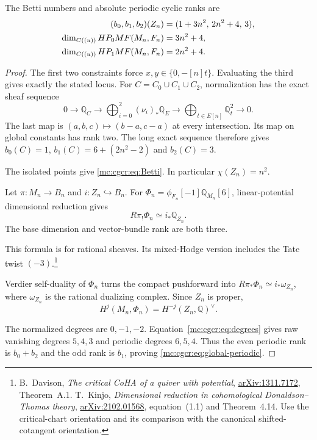 \begin{theorem}\label{mc:cgcr:thm:global-periodic}
The Betti numbers and absolute periodic cyclic ranks are
\begin{align}
 (b_0,b_1,b_2)(Z_n)&=(1+3n^2,\,2n^2+4,\,3),
       \label{mc:cgcr:eq:Betti}\\
 \dim_{\mathbb C((u))}\operatorname{HP}_{\bar0}
             \operatorname{MF}(M_n,F_n)&=3n^2+4,\notag\\
 \dim_{\mathbb C((u))}\operatorname{HP}_{\bar1}
             \operatorname{MF}(M_n,F_n)&=2n^2+4.
       \label{mc:cgcr:eq:global-periodic}
\end{align}
\end{theorem}

\begin{proof}
The first two constraints force $x,y\in\{0,-[n]t\}$.
Evaluating the third gives exactly the stated locus.
For $C=C_0\cup C_1\cup C_2$, normalization has the
exact sheaf sequence
\begin{equation}\label{mc:cgcr:eq:normalization}
 0\longrightarrow\mathbb Q_C
 \longrightarrow\bigoplus_{i=0}^2(\nu_i)_*\mathbb Q_E
 \longrightarrow\bigoplus_{t\in E[n]}\mathbb Q_t^2
 \longrightarrow0.
\end{equation}
The last map is $(a,b,c)\mapsto(b-a,c-a)$ at every
intersection. Its map on global constants has rank two.
The long exact sequence therefore gives
$b_0(C)=1$, $b_1(C)=6+(2n^2-2)$ and $b_2(C)=3$.

The isolated points give \eqref{mc:cgcr:eq:Betti}.
In particular $\chi(Z_n)=n^2$.

Let $\pi:M_n\to B_n$ and $i:Z_n\hookrightarrow B_n$.
For $\Phi_n=\phi_{F_n}[-1]\mathbb Q_{M_n}[6]$,
linear-potential dimensional reduction gives
\begin{equation}\label{mc:cgcr:eq:reduction}
 R\pi_!\Phi_n\simeq i_*\mathbb Q_{Z_n}.
\end{equation}
The base dimension and vector-bundle rank are both three.

This formula is for rational sheaves. Its mixed-Hodge
version includes the Tate twist $(-3)$.\footnote{
B.~Davison, \emph{The critical CoHA of a quiver with
potential}, \href{https://arxiv.org/abs/1311.7172}{arXiv:1311.7172},
Theorem~A.1. T.~Kinjo, \emph{Dimensional reduction in
cohomological Donaldson--Thomas theory},
\href{https://arxiv.org/abs/2102.01568}{arXiv:2102.01568},
equation~(1.1) and Theorem~4.14.
Use the critical-chart orientation and its comparison
with the canonical shifted-cotangent orientation.}

Verdier self-duality of $\Phi_n$ turns the compact
pushforward into
$R\pi_*\Phi_n\simeq i_*\omega_{Z_n}$,
where $\omega_{Z_n}$ is the rational dualizing complex.
Since $Z_n$ is proper,
\[
 H^j(M_n,\Phi_n)=H^{-j}(Z_n,\mathbb Q)^\vee.
\]

The normalized degrees are $0,-1,-2$.
Equation~\eqref{mc:cgcr:eq:degrees} gives raw vanishing
degrees $5,4,3$ and periodic degrees $6,5,4$.
Thus the even periodic rank is $b_0+b_2$ and the odd
rank is $b_1$, proving \eqref{mc:cgcr:eq:global-periodic}.
\end{proof}

